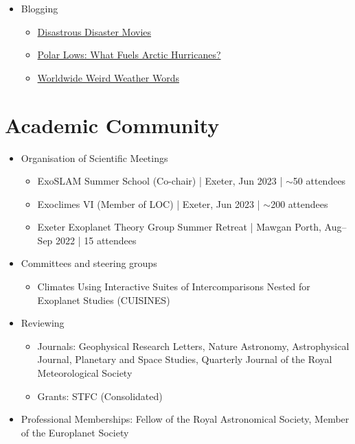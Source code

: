\documentclass[a4paper, 11pt]{article}
\begin{document}
\begin{itemize}[nosep, leftmargin=10pt]
    \item Blogging
    \begin{itemize}
        \item \href{http://www.scisnack.com/2015/12/17/disastrous-disaster-movies}{Disastrous Disaster Movies}
        \item \href{http://www.scisnack.com/2015/03/04/polar-lows-what-fuels-arctic-hurricanes}{Polar Lows: What Fuels Arctic Hurricanes?}
        \item \href{http://www.scisnack.com/2014/12/17/worldwide-weird-weather-words}{Worldwide Weird Weather Words}
    \end{itemize}
\end{itemize}

\section{Academic Community}
\begin{itemize}[nosep, leftmargin=10pt]
    \item Organisation of Scientific Meetings
    \begin{itemize}
        \item ExoSLAM Summer School (Co-chair) | Exeter, Jun 2023 | $\sim$50 attendees
        \item Exoclimes VI (Member of LOC) | Exeter, Jun 2023 | $\sim$200 attendees
        \item Exeter Exoplanet Theory Group Summer Retreat | Mawgan Porth, Aug--Sep 2022 | 15 attendees
    \end{itemize}
    \item Committees and steering groups
    \begin{itemize}
        \item Climates Using Interactive Suites of Intercomparisons Nested for Exoplanet Studies (CUISINES)
    \end{itemize}
    \item Reviewing
    \begin{itemize}
        \item Journals: Geophysical Research Letters, Nature Astronomy, Astrophysical Journal, Planetary and Space Studies, Quarterly Journal of the Royal Meteorological Society
        \item Grants: STFC (Consolidated)
    \end{itemize}
    \item Professional Memberships: Fellow of the Royal Astronomical Society, Member of the Europlanet Society
\end{itemize}
\end{document}
